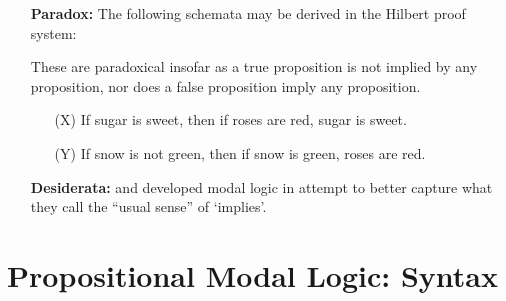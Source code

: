 \documentclass[a4paper, 11pt]{article} %
\begin{document}
\begin{enumerate}[leftmargin=1.2in]
	\item[\bf Paradox:] The following schemata may be derived in the Hilbert proof system:
	      \begin{itemize}\small
	      \end{itemize}
	      These are paradoxical insofar as a true proposition is not implied by any proposition, nor does a false proposition imply any proposition.
	      \begin{itemize}
		      \item[(X)] If sugar is sweet, then if roses are red, sugar is sweet.
		      \item[(Y)] If snow is not green, then if snow is green, roses are red.
	      \end{itemize}
	\item[\bf Desiderata:] \citet{Lewis1912} and \citet{Lewis1932} developed modal logic in attempt to better capture what they call the ``usual sense'' of `implies'.
\end{enumerate}




\section*{\sc Propositional Modal Logic: Syntax}
\end{document}
